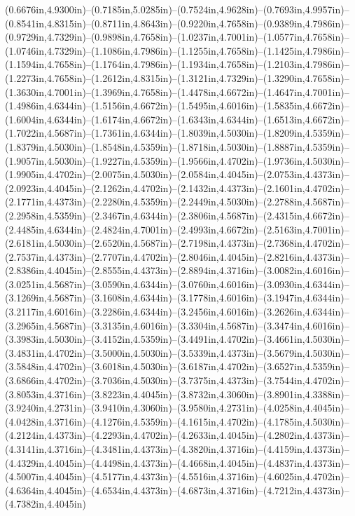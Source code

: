 (0.6676in,4.9300in)--(0.7185in,5.0285in)--(0.7524in,4.9628in)--(0.7693in,4.9957in)--(0.8541in,4.8315in)--(0.8711in,4.8643in)--(0.9220in,4.7658in)--(0.9389in,4.7986in)--(0.9729in,4.7329in)--(0.9898in,4.7658in)--(1.0237in,4.7001in)--(1.0577in,4.7658in)--(1.0746in,4.7329in)--(1.1086in,4.7986in)--(1.1255in,4.7658in)--(1.1425in,4.7986in)--(1.1594in,4.7658in)--(1.1764in,4.7986in)--(1.1934in,4.7658in)--(1.2103in,4.7986in)--(1.2273in,4.7658in)--(1.2612in,4.8315in)--(1.3121in,4.7329in)--(1.3290in,4.7658in)--(1.3630in,4.7001in)--(1.3969in,4.7658in)--(1.4478in,4.6672in)--(1.4647in,4.7001in)--(1.4986in,4.6344in)--(1.5156in,4.6672in)--(1.5495in,4.6016in)--(1.5835in,4.6672in)--(1.6004in,4.6344in)--(1.6174in,4.6672in)--(1.6343in,4.6344in)--(1.6513in,4.6672in)--(1.7022in,4.5687in)--(1.7361in,4.6344in)--(1.8039in,4.5030in)--(1.8209in,4.5359in)--(1.8379in,4.5030in)--(1.8548in,4.5359in)--(1.8718in,4.5030in)--(1.8887in,4.5359in)--(1.9057in,4.5030in)--(1.9227in,4.5359in)--(1.9566in,4.4702in)--(1.9736in,4.5030in)--(1.9905in,4.4702in)--(2.0075in,4.5030in)--(2.0584in,4.4045in)--(2.0753in,4.4373in)--(2.0923in,4.4045in)--(2.1262in,4.4702in)--(2.1432in,4.4373in)--(2.1601in,4.4702in)--(2.1771in,4.4373in)--(2.2280in,4.5359in)--(2.2449in,4.5030in)--(2.2788in,4.5687in)--(2.2958in,4.5359in)--(2.3467in,4.6344in)--(2.3806in,4.5687in)--(2.4315in,4.6672in)--(2.4485in,4.6344in)--(2.4824in,4.7001in)--(2.4993in,4.6672in)--(2.5163in,4.7001in)--(2.6181in,4.5030in)--(2.6520in,4.5687in)--(2.7198in,4.4373in)--(2.7368in,4.4702in)--(2.7537in,4.4373in)--(2.7707in,4.4702in)--(2.8046in,4.4045in)--(2.8216in,4.4373in)--(2.8386in,4.4045in)--(2.8555in,4.4373in)--(2.8894in,4.3716in)--(3.0082in,4.6016in)--(3.0251in,4.5687in)--(3.0590in,4.6344in)--(3.0760in,4.6016in)--(3.0930in,4.6344in)--(3.1269in,4.5687in)--(3.1608in,4.6344in)--(3.1778in,4.6016in)--(3.1947in,4.6344in)--(3.2117in,4.6016in)--(3.2286in,4.6344in)--(3.2456in,4.6016in)--(3.2626in,4.6344in)--(3.2965in,4.5687in)--(3.3135in,4.6016in)--(3.3304in,4.5687in)--(3.3474in,4.6016in)--(3.3983in,4.5030in)--(3.4152in,4.5359in)--(3.4491in,4.4702in)--(3.4661in,4.5030in)--(3.4831in,4.4702in)--(3.5000in,4.5030in)--(3.5339in,4.4373in)--(3.5679in,4.5030in)--(3.5848in,4.4702in)--(3.6018in,4.5030in)--(3.6187in,4.4702in)--(3.6527in,4.5359in)--(3.6866in,4.4702in)--(3.7036in,4.5030in)--(3.7375in,4.4373in)--(3.7544in,4.4702in)--(3.8053in,4.3716in)--(3.8223in,4.4045in)--(3.8732in,4.3060in)--(3.8901in,4.3388in)--(3.9240in,4.2731in)--(3.9410in,4.3060in)--(3.9580in,4.2731in)--(4.0258in,4.4045in)--(4.0428in,4.3716in)--(4.1276in,4.5359in)--(4.1615in,4.4702in)--(4.1785in,4.5030in)--(4.2124in,4.4373in)--(4.2293in,4.4702in)--(4.2633in,4.4045in)--(4.2802in,4.4373in)--(4.3141in,4.3716in)--(4.3481in,4.4373in)--(4.3820in,4.3716in)--(4.4159in,4.4373in)--(4.4329in,4.4045in)--(4.4498in,4.4373in)--(4.4668in,4.4045in)--(4.4837in,4.4373in)--(4.5007in,4.4045in)--(4.5177in,4.4373in)--(4.5516in,4.3716in)--(4.6025in,4.4702in)--(4.6364in,4.4045in)--(4.6534in,4.4373in)--(4.6873in,4.3716in)--(4.7212in,4.4373in)--(4.7382in,4.4045in) 